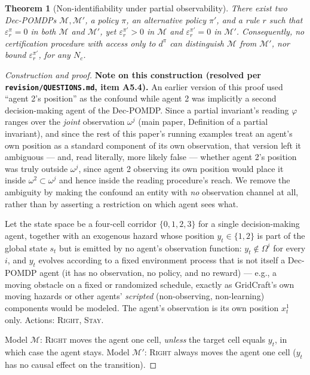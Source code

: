 \documentclass[11pt]{article}
\theoremstyle{plain}
\newtheorem{theorem}{Theorem}[section]
\theoremstyle{definition}
\theoremstyle{remark}
\begin{document}
\begin{theorem}[Non-identifiability under partial observability]
\label{thm:t5-full}
There exist two Dec-POMDPs $\mathcal{M},\mathcal{M}'$, a policy $\pi$, an alternative policy $\pi'$, and a rule $r$ such that $\varepsilon^\pi_r=0$ in both $\mathcal{M}$ and $\mathcal{M}'$, yet $\varepsilon^{\pi'}_r>0$ in $\mathcal{M}$ and $\varepsilon^{\pi'}_r=0$ in $\mathcal{M}'$. Consequently, no certification procedure with access only to $d^\pi$ can distinguish $\mathcal{M}$ from $\mathcal{M}'$, nor bound $\varepsilon^{\pi'}_r$, for any $N_c$.
\end{theorem}
\begin{proof}[Construction and proof]
\textbf{Note on this construction (resolved per \texttt{revision/QUESTIONS.md}, item A5.4).} An earlier version of this proof used ``agent 2's position'' as the confound while agent 2 was implicitly a second decision-making agent of the Dec-POMDP. Since a partial invariant's reading $\varphi$ ranges over the \emph{joint} observation $\omega^j$ (main paper, Definition of a partial invariant), and since the rest of this paper's running examples treat an agent's own position as a standard component of its own observation, that version left it ambiguous --- and, read literally, more likely false --- whether agent 2's position was truly outside $\omega^j$, since agent 2 observing its own position would place it inside $\omega^2\subset\omega^j$ and hence inside the reading procedure's reach. We remove the ambiguity by making the confound an entity with \emph{no} observation channel at all, rather than by asserting a restriction on which agent sees what.

Let the state space be a four-cell corridor $\{0,1,2,3\}$ for a single decision-making agent, together with an exogenous hazard whose position $y_t\in\{1,2\}$ is part of the global state $s_t$ but is emitted by no agent's observation function: $y_t\notin\Omega^i$ for every $i$, and $y_t$ evolves according to a fixed environment process that is not itself a Dec-POMDP agent (it has no observation, no policy, and no reward) --- e.g., a moving obstacle on a fixed or randomized schedule, exactly as GridCraft's own moving hazards or other agents' \emph{scripted} (non-observing, non-learning) components would be modeled. The agent's observation is its own position $x^1_t$ only. Actions: \textsc{Right}, \textsc{Stay}.

Model $\mathcal{M}$: \textsc{Right} moves the agent one cell, \emph{unless} the target cell equals $y_t$, in which case the agent stays. Model $\mathcal{M}'$: \textsc{Right} always moves the agent one cell ($y_t$ has no causal effect on the transition).


\end{proof}
\end{document}
